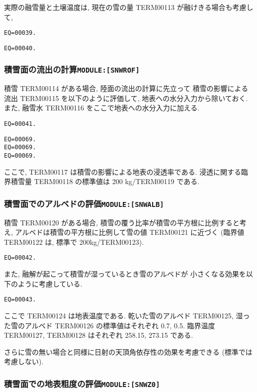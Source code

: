 実際の融雪量と土壌温度は, 現在の雪の量 TERM00113 が融けきる場合も考慮して, 
\begin{verbatim}
EQ=00039.
\end{verbatim}
\begin{verbatim}
EQ=00040.
\end{verbatim}

\subsubsection{積雪面の流出の計算\texttt{MODULE:[SNWROF]}}
 
積雪 TERM00114 がある場合, 陸面の流出の計算に先立って
積雪の影響による流出 TERM00115 を以下のように評価して, 
地表への水分入力から除いておく. 
また, 融雪水 TERM00116 をここで地表への水分入力に加える. 
\begin{verbatim}
EQ=00041.
\end{verbatim}
\begin{verbatim}
EQ=00069.
EQ=00069.
EQ=00069.
\end{verbatim}
ここで, TERM00117 は積雪の影響による地表の浸透率である. 
浸透に関する臨界積雪量 TERM00118 の標準値は 200 kg/TERM00119 である. 

\subsubsection{積雪面でのアルベドの評価\texttt{MODULE:[SNWALB]}}

積雪 TERM00120 がある場合, 
積雪の覆う比率が積雪の平方根に比例すると考え,
アルベドは積雪の平方根に比例して雪の値 TERM00121 に近づく
(臨界値 TERM00122 は, 標準で 200kg/TERM00123).
%
\begin{verbatim}
EQ=00042.
\end{verbatim}

また, 融解が起こって積雪が湿っているとき雪のアルベドが
小さくなる効果を以下のように考慮している. 
\begin{verbatim}
EQ=00043.
\end{verbatim}
ここで TERM00124 は地表温度である. 
乾いた雪のアルベド TERM00125, 湿った雪のアルベド TERM00126
の標準値はそれぞれ 0.7, 0.5. 
臨界温度 TERM00127, TERM00128 はそれぞれ 258.15, 273.15 である. 

さらに雪の無い場合と同様に日射の天頂角依存性の効果を考慮できる
(標準では考慮しない). 

\subsubsection{積雪面での地表粗度の評価\texttt{MODULE:[SNWZ0]}}

